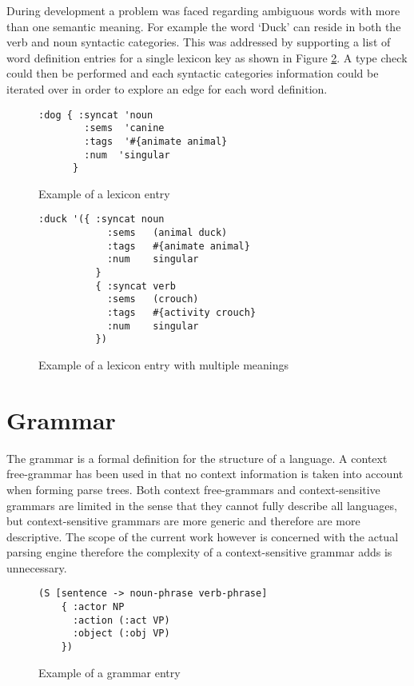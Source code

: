 \documentclass[11pt, a4paper]{article}
\begin{document}
During development a problem was faced regarding ambiguous words with more than one semantic meaning. For example the word `Duck' can reside in both the verb and noun syntactic categories. This was addressed by supporting a list of word definition entries for a single lexicon key as shown in Figure \ref{fig:lexicon-entry-ambig}. A type check could then be performed and each syntactic categories information could be iterated over in order to explore an edge for each word definition.

\begin{figure}[H]
\begin{Verbatim}[frame=leftline]
 :dog { :syncat 'noun
        :sems  'canine
        :tags  '#{animate animal}
        :num  'singular 
      }
\end{Verbatim}
\caption{Example of a lexicon entry}
\label{fig:lexicon-entry}
\end{figure}

\begin{figure}[H]
	\begin{Verbatim}[frame=leftline]
  :duck '({ :syncat noun
            :sems   (animal duck)
            :tags   #{animate animal}
            :num    singular
          }
          { :syncat verb
            :sems   (crouch)
            :tags   #{activity crouch}
            :num    singular
          })
	\end{Verbatim}
	\caption{Example of a lexicon entry with multiple meanings}
	\label{fig:lexicon-entry-ambig}
\end{figure}





\section{Grammar}\label{sec:grammar}
The grammar is a formal definition for the structure of a language. A context free-grammar has been used in that no context information is taken into account when forming parse trees. Both context free-grammars and context-sensitive grammars are limited in the sense that they cannot fully describe all languages, but context-sensitive grammars are more generic and therefore are more descriptive. The scope of the current work however is concerned with the actual parsing engine therefore the complexity of a context-sensitive grammar adds is unnecessary. 

\begin{figure}[H]
\begin{Verbatim}[frame=leftline]
 (S [sentence -> noun-phrase verb-phrase]
    { :actor NP
      :action (:act VP)
      :object (:obj VP)
    })
\end{Verbatim}
\caption{Example of a grammar entry}
\label{fig:grammar-entry}
\end{figure}
\end{document}
